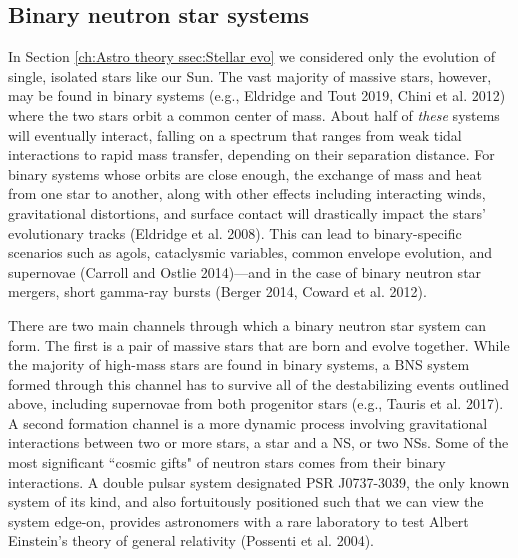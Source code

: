 \documentclass[1.5,11pt]{beavtex}
\begin{document}
\subsection{Binary neutron star systems}
\label{ch:Astro theory ssec:BNS systems}

In Section \ref{ch:Astro theory ssec:Stellar evo} we considered only the evolution of single, isolated stars like our Sun. The vast majority of massive stars, however, may be found in binary systems (e.g., Eldridge and Tout 2019, Chini et al. 2012) where the two stars orbit a common center of mass. About half of \textit{these} systems will eventually interact, falling on a spectrum that ranges from weak tidal interactions to rapid mass transfer, depending on their separation distance. For binary systems whose orbits are close enough, the exchange of mass and heat from one star to another, along with other effects including interacting winds, gravitational distortions, and surface contact will drastically impact the stars' evolutionary tracks (Eldridge et al. 2008). This can lead to binary-specific scenarios such as agols, cataclysmic variables, common envelope evolution, and supernovae (Carroll and Ostlie 2014)---and in the case of binary neutron star mergers, short gamma-ray bursts (Berger 2014, Coward et al. 2012). 

There are two main channels through which a binary neutron star system can form. The first is a pair of massive stars that are born and evolve together. While the majority of high-mass stars are found in binary systems, a BNS system formed through this channel has to survive all of the destabilizing events outlined above, including supernovae from both progenitor stars (e.g., Tauris et al. 2017). A second formation channel is a more dynamic process involving gravitational interactions between two or more stars, a star and a NS, or two NSs. Some of the most significant ``cosmic gifts" of neutron stars comes from their binary interactions. A double pulsar system designated PSR J0737-3039, the only known system of its kind, and also fortuitously positioned such that we can view the system edge-on, provides astronomers with a rare laboratory to test Albert Einstein's theory of general relativity (Possenti et al. 2004). 
 
\end{document}
